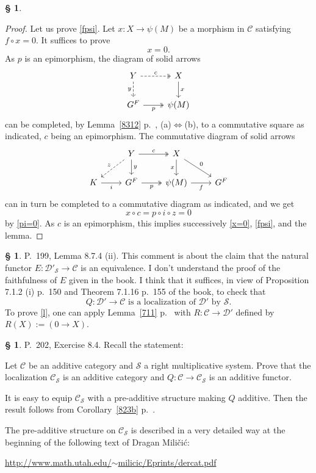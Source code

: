 \documentclass[12pt]{article}%
\theoremstyle{remark}
\theoremstyle{definition}
\newtheorem{s}[thm]{\S}%
\newcommand{\cc}{\mathcal}
\newcommand{\C}{\mathcal C}
\newcommand{\ssi}{\Leftrightarrow}%
\begin{document}
\begin{s}
\begin{proof}
Let us prove \eqref{fpsi}. Let $x:X\to\psi(M)$ be a morphism in $\C$ satisfying $f\circ x=0$. It suffices to prove 
%
\begin{equation}\label{x=0}
x=0.
\end{equation}
% 
As $p$ is an epimorphism, the diagram of solid arrows 
$$
\begin{tikzcd}
Y\ar[dashed]{d}[swap]{y}\ar[dashed, two heads]{r}{c}&X\ar{d}{x}\\ 
G^F\ar[two heads]{r}[swap]{p}&\psi(M)
\end{tikzcd}
$$ 
can be completed, by Lemma~\ref{8312} p.~\pageref{8312}, (a)$\ssi$(b), to a commutative square as indicated, $c$ being an epimorphism. The commutative diagram of solid arrows 
$$
\begin{tikzcd}
{}&Y\ar[dashed]{dl}[swap]{z}\ar{d}{y}\ar[two heads]{r}{c}&X\ar{d}[swap]{x}\ar{dr}{0}\\ 
K\ar{r}[swap]{i}&G^F\ar[two heads]{r}[swap]{p}&\psi(M)\ar{r}[swap]{f}&G^F
\end{tikzcd}
$$ 
can in turn be completed to a commutative diagram as indicated, and we get 
$$
x\circ c=p\circ i\circ z=0 
$$  
by \eqref{pi=0}. As $c$ is an epimorphism, this implies successively \eqref{x=0}, \eqref{fpsi}, and the lemma. 
\end{proof}
\end{s}


\begin{s}
P.~199, Lemma 8.7.4 (ii). This comment is about the claim that the natural functor $E:\cc D'_{\cc S}\to\C$ is an equivalence. I don't understand the proof of the faithfulness of $E$ given in the book. I think that it suffices, in view of Proposition 7.1.2 (i) p.~150 and Theorem 7.1.16 p.~155 of the book, to check that
%
\begin{equation}\label{l}
Q:\cc D'\to\C\text{ is a localization of }\cc D'\text{ by }\cc S.
\end{equation}
%
To prove \eqref{l}, one can apply Lemma~\ref{711} p.~\pageref{711} with $R:\C\to\cc D'$ defined by $R(X):=(0\to X)$.
\end{s}


\begin{s} 
P.~202, Exercise 8.4. Recall the statement: 

Let $\C$ be an additive category and $\cc S$ a right multiplicative system. Prove that the localization $\C_{\cc S}$ is an additive category and $Q:\C\to\C_{\cc S}$ is an additive functor. 

It is easy to equip $\C_{\cc S}$ with a pre-additive structure making $Q$ additive. Then the result follows from Corollary~\ref{823b} p.~\pageref{823b}. 

The pre-additive structure on $\C_{\cc S}$ is described in a very detailed way at the beginning of the following text of Dragan Mili\v{c}i\'c:  
%
\begin{center}\href{http://www.math.utah.edu/~milicic/Eprints/dercat.pdf}{http://www.math.utah.edu/$\sim$milicic/Eprints/dercat.pdf}
\end{center}
\end{s}
\end{document}

